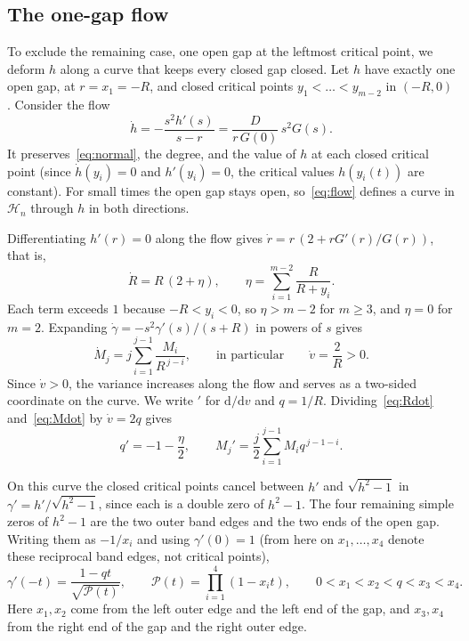 \documentclass[11pt]{article}
\theoremstyle{remark}
\newcommand{\HH}{\mathcal H}
\newcommand{\dd}{\mathrm d}
\begin{document}
\subsection{The one-gap flow}
To exclude the remaining case, one open gap at the leftmost critical point,
we deform $h$ along a curve that keeps every closed gap closed. Let $h$ have
exactly one open gap, at $r=x_1=-R$, and closed critical points
$y_1<\dots<y_{m-2}$ in $(-R,0)$. Consider the flow
\begin{equation}\label{eq:flow}
\dot h=-\frac{s^2h'(s)}{s-r}=\frac{D}{r\,G(0)}\,s^2G(s).
\end{equation}
It preserves~\eqref{eq:normal}, the degree, and the value of $h$ at each
closed critical point (since $\dot h(y_i)=0$ and $h'(y_i)=0$, the critical
values $h(y_i(t))$ are constant). For small times the open gap stays open,
so~\eqref{eq:flow} defines a curve in $\HH_n$ through $h$ in both
directions.

Differentiating $h'(r)=0$ along the flow gives
$\dot r=r\,(2+rG'(r)/G(r))$, that is,
\begin{equation}\label{eq:Rdot}
\dot R=R\,(2+\eta),\qquad
\eta=\sum_{i=1}^{m-2}\frac R{R+y_i}.
\end{equation}
Each term exceeds $1$ because $-R<y_i<0$, so $\eta>m-2$ for $m\ge3$, and
$\eta=0$ for $m=2$. Expanding $\dot\gamma=-s^2\gamma'(s)/(s+R)$ in powers
of $s$ gives
\begin{equation}\label{eq:Mdot}
\dot M_j=j\sum_{i=1}^{j-1}\frac{M_i}{R^{\,j-i}},\qquad\text{in particular}\qquad
\dot v=\frac2R>0.
\end{equation}
Since $\dot v>0$, the variance increases along the flow and serves as a
two-sided coordinate on the curve. We write $'$ for $\dd/\dd v$ and $q=1/R$.
Dividing~\eqref{eq:Rdot} and~\eqref{eq:Mdot} by $\dot v=2q$ gives
\begin{equation}\label{eq:vflow}
q'=-1-\frac\eta2,\qquad
M_j'=\frac j2\sum_{i=1}^{j-1}M_iq^{\,j-1-i}.
\end{equation}

On this curve the closed critical points cancel between $h'$ and
$\sqrt{h^2-1}$ in $\gamma'=h'/\sqrt{h^2-1}$, since each is a double zero of
$h^2-1$. The four remaining simple zeros of $h^2-1$ are the two outer band
edges and the two ends of the open gap. Writing them as $-1/x_i$ and using
$\gamma'(0)=1$ (from here on $x_1,\dots,x_4$ denote these reciprocal band
edges, not critical points),
\begin{equation}\label{eq:quartic}
\gamma'(-t)=\frac{1-qt}{\sqrt{\mathcal P(t)}},\qquad
\mathcal P(t)=\prod_{i=1}^4(1-x_it),\qquad
0<x_1<x_2<q<x_3<x_4.
\end{equation}
Here $x_1,x_2$ come from the left outer edge and the left end of the gap,
and $x_3,x_4$ from the right end of the gap and the right outer edge.
\end{document}
